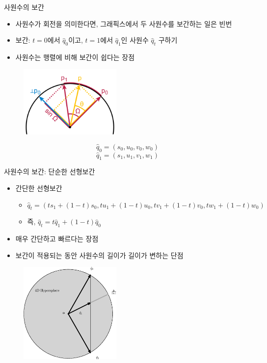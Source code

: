 \begin{frame}[fragile]{사원수의 보간}

\begin{itemize}
\item 사원수가 회전을 의미한다면, 그래픽스에서 두 사원수를 보간하는 일은 빈번
\item 보간: $t=0$에서 ${\hat q}_0$이고, $t=1$에서 ${\hat q}_1$인 사원수 ${\hat q}_t$ 구하기
\item 사원수는 행렬에 비해 보간이 쉽다는 장점
\end{itemize}

\begin{figure}
    \includegraphics[width=5cm]{Math_quaternion/QSlerp.png}
\end{figure}

$${\hat q}_0 = (s_0 , u_0, v_0, w_0 )$$
$${\hat q}_1 = (s_1 , u_1, v_1, w_1 )$$

\end{frame}

\begin{frame}[fragile]{사원수의 보간: 단순한 선형보간}

\begin{itemize}
\item 간단한 선형보간
	\begin{itemize}
	\item ${\hat q}_t = ( t s_1 + (1-t) s_0 , t u_1 + (1-t) u_0 , t v_1 + (1-t) v_0 , t w_1 + (1-t) w_0)$
	\item 즉, ${\hat q}_t = t {\hat q}_1 + (1-t) {\hat q}_0 $
	\end{itemize}
\item 매우 간단하고 빠르다는 장점
\item 보간이 적용되는 동안 사원수의 길이가 길이가 변하는 단점
\end{itemize}

\begin{figure}
    \includegraphics[width=5cm]{Math_quaternion/quaternionLerp.eps}
\end{figure}

\end{frame}

